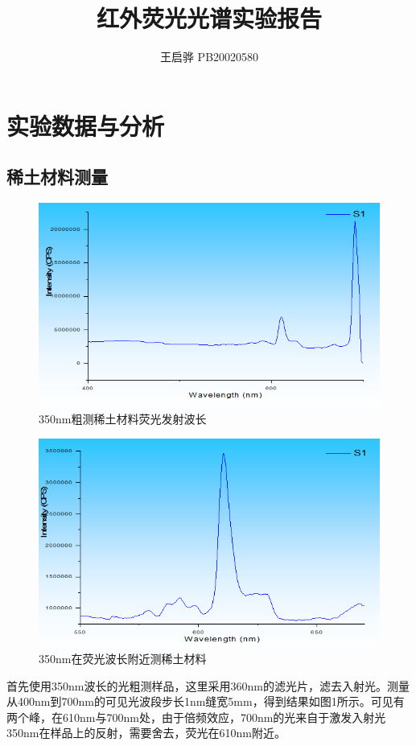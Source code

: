 \documentclass{article}
\title{\songti \zihao{2}\bfseries 红外荧光光谱实验报告}
\author{王启骅 PB20020580}
\begin{document}
	\maketitle
	\section{实验数据与分析}
	\subsection{稀土材料测量}
	\begin{figure}[!h]
		\centering
		\includegraphics[scale=0.8]{1}
		\caption{\heiti{}350nm粗测稀土材料荧光发射波长}
		
	\end{figure}


	\begin{figure}[!h]
	\centering
	\includegraphics[scale=0.8]{2}
	\caption{\heiti{}350nm在荧光波长附近测稀土材料}
	
\end{figure}
首先使用350nm波长的光粗测样品，这里采用360nm的滤光片，滤去入射光。测量从400nm到700nm的可见光波段步长1nm缝宽5mm，得到结果如图1所示。可见有两个峰，在610nm与700nm处，由于倍频效应，700nm的光来自于激发入射光350nm在样品上的反射，需要舍去，荧光在610nm附近。
\end{document}
